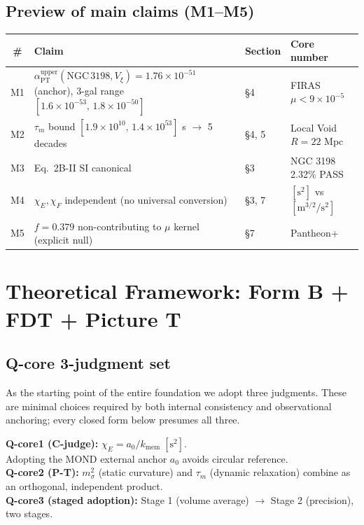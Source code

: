 \documentclass[11pt,a4paper]{article}
\newcommand{\kmem}{k_{\mathrm{mem}}}
\newcommand{\Vxi}{V_{\xi}}
\newcommand{\aPT}{\alpha_{\mathrm{PT}}}
\newcommand{\taum}{\tau_{m}}
\newcommand{\msigma}{m_{\sigma}}
\begin{document}
\subsection{Preview of main claims (M1--M5)}
\begin{center}\small
\begin{tabular}{@{}cllp{52mm}@{}}
\toprule
\# & Claim & Section & Core number \\
\midrule
M1 & $\aPT^{\mathrm{upper}}(\mathrm{NGC\,3198},\Vxi) = 1.76 \times 10^{-51}$ (anchor), 3-gal range $[1.6\times10^{-53},\,1.8\times10^{-50}]$ & \S 4 & FIRAS $\mu < 9 \times 10^{-5}$ \\
M2 & $\taum$ bound $[1.9 \times 10^{10},\, 1.4 \times 10^{53}]$ s $\to$ 5 decades & \S 4, 5 & Local Void $R=22$ Mpc \\
M3 & Eq.~2B-II SI canonical & \S 3 & NGC 3198 2.32\% PASS \\
M4 & $\chi_E,\chi_F$ independent (no universal conversion) & \S 3, 7 & $[\mathrm{s}^2]$ vs $[\mathrm{m}^{3/2}/\mathrm{s}^2]$ \\
M5 & $f=0.379$ non-contributing to $\mu$ kernel (explicit null) & \S 7 & Pantheon+~\citep{Scolnic2022} \\
\bottomrule
\end{tabular}
\end{center}

\section{Theoretical Framework: Form B + FDT + Picture T}

\subsection{Q-core 3-judgment set}
As the starting point of the entire foundation we adopt three judgments. These are minimal choices
required by both internal consistency and observational anchoring; every closed form below presumes
all three.

\begin{keybox}
\textbf{Q-core1 (C-judge):} $\chi_E = a_0 / \kmem\;[\mathrm{s}^2]$. \\
\quad Adopting the MOND external anchor $a_0$ avoids circular reference. \\[2pt]
\textbf{Q-core2 (P-T):} $\msigma^2$ (static curvature) and $\taum$ (dynamic relaxation) combine as
an orthogonal, independent product. \\[2pt]
\textbf{Q-core3 (staged adoption):} Stage 1 (volume average) $\to$ Stage 2 (precision), two stages.
\end{keybox}
\end{document}
